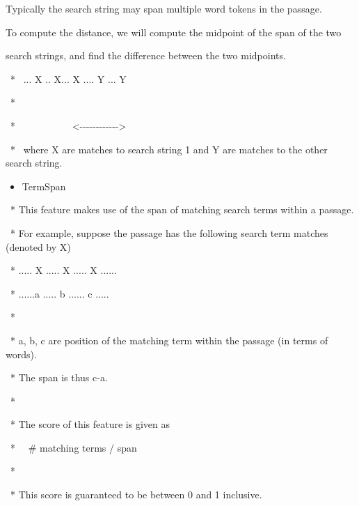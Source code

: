 Typically the search string may span multiple word tokens in the
passage. 

To compute the distance, we will compute the midpoint of the span of the
two

search strings, and find the difference between the two midpoints. 

\ * \ ... X .. X... X .... Y ... Y

\ * \ \ \ \ \ \ \ \ \ \ {\textbar} \ \ \ \ \ \ \ \ \ \ \ \ \ {\textbar}

\ *
\ \ \ \ \ \ \ \ \ \ \ {\textless}-{}-{}-{}-{}-{}-{}-{}-{}-{}-{}-{}-{\textgreater}

\ * \ where X are matches to search string 1 and Y are matches to the
other search string.


\begin{itemize}
\item TermSpan
\end{itemize}
\ * This feature makes use of the span of matching search terms within a
passage.

\ * For example, suppose the passage has the following search term
matches (denoted by X)

\ * ..... X ..... X ..... X ......

\ * ......a ..... b ...... c .....

\ * 

\ * a, b, c are position of the matching term within the passage (in
terms of words).

\ * The span is thus {\textbar}c-a{\textbar}.

\ * 

\ * The score of this feature is given as 

\ * \ \ \# matching terms / span

\ * 

\ * This score is guaranteed to be between 0 and 1 inclusive.


